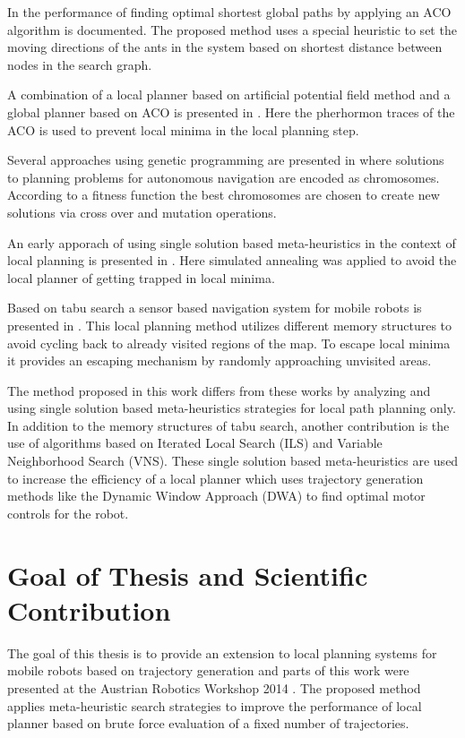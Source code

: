 In \cite{buniyamin2011robotantcolony} the performance of finding optimal shortest global paths by applying an ACO algorithm is documented. 
The proposed method uses a special heuristic to set the moving directions of the ants in the system based on shortest distance between nodes in the search graph.  

A combination of a local planner based on artificial potential field method and a global planner based on ACO is presented in \cite{mei2006hybrid}. 
Here the pherhormon traces of the ACO is used to prevent local minima in the local planning step.

Several approaches using genetic programming are presented in \cite{manikas2007genetic} where solutions to planning problems for autonomous navigation are encoded as chromosomes. 
According to a fitness function the best chromosomes are chosen to create new solutions via cross over and mutation operations. 

An early apporach of using single solution based meta-heuristics in the context of local planning is presented in \cite{park2001obstacle}.
Here simulated annealing was applied to avoid the local planner of getting trapped in local minima.

Based on tabu search a sensor based navigation system for mobile robots is presented in \cite{masehian2008sensor}.
This local planning method utilizes different memory structures to avoid cycling back to already visited regions of the map. 
To escape local minima it provides an escaping mechanism by randomly approaching unvisited areas.

The method proposed in this work differs from these works by analyzing and using single solution based meta-heuristics strategies for local path planning only. 
In addition to the memory structures of tabu search, another contribution is the use of algorithms based on Iterated Local Search (ILS) and Variable Neighborhood Search (VNS). 
These single solution based meta-heuristics are used to increase the efficiency of a local planner which uses trajectory generation methods like the Dynamic Window Approach (DWA) to find optimal motor controls for the robot.

\section{Goal of Thesis and Scientific Contribution}\label{sec:goal}
The goal of this thesis is to provide an extension to local planning systems for mobile robots based on trajectory generation and parts of this work were presented at the Austrian Robotics Workshop 2014 \cite{myself}. 
The proposed method applies meta-heuristic search strategies to improve the performance of local planner based on brute force evaluation of a fixed number of trajectories.

